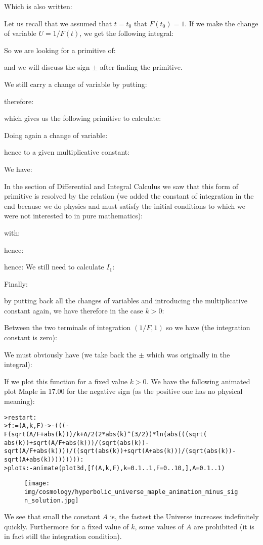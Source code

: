 	Which is also written:
	
	Let us recall that we assumed that $t=t_0$ that $F(t_0)=1$. If we make the change of variable $U=1/F(t)$, we get the following integral:
	
	So we are looking for a primitive of:
	
	and we will discuss the sign $\pm$ after finding the primitive.

	We still carry a change of variable by putting:
	
	 therefore:
	
	which gives us the following primitive to calculate:
	
	Doing again a change of variable:
	
	hence to a given multiplicative constant:
	
	We have:
	
	In the section of Differential and Integral Calculus we saw that this form of primitive is resolved by the relation (we added the constant of integration in the end because we do physics and must satisfy the initial conditions to which we were not interested to in pure mathematics):
		
	with:
	
	hence:
	
	hence:
	We still need to calculate $I_1$:
	
	Finally:
	
	by putting back all the changes of variables and introducing the multiplicative constant again, we have therefore in the case $k>0$:
	
	Between the two terminals of integration $(1/F,1)$ so we have (the integration constant is zero):
	
	We must obviously have (we take back the $\pm$ which was originally in the integral):
	
	If we plot this function for a fixed value $k>0$. We have the following  animated plot Maple in 17.00 for the negative sign (as the positive one has no physical meaning):
	
	\texttt{>restart:\\
	>f:=(A,k,F)->-(((-F(sqrt(A/F+abs(k)))/k+A/2(2*abs(k)\string^(3/2))*ln(abs(((sqrt(\\
	abs(k))+sqrt(A/F+abs(k)))/(sqrt(abs(k))-sqrt(A/F+abs(k))))/((sqrt(abs(k))+sqrt(A+abs(k)))/(sqrt(abs(k))-sqrt(A+abs(k))))))))):\\
	>plots:-animate(plot3d,[f(A,k,F),k=0.1..1,F=0..10,],A=0.1..1)
	}
	\begin{figure}[H]
		\begin{center}
		\texttt{[image: img/cosmology/hyperbolic\_universe\_maple\_animation\_minus\_sign\_solution.jpg]}
		\end{center}
	\end{figure}
	We see that small the constant $A$ is, the fastest the Universe increases indefinitely quickly. Furthermore for a fixed value of $k$, some values of $A$ are prohibited (it is in fact still the integration condition).

